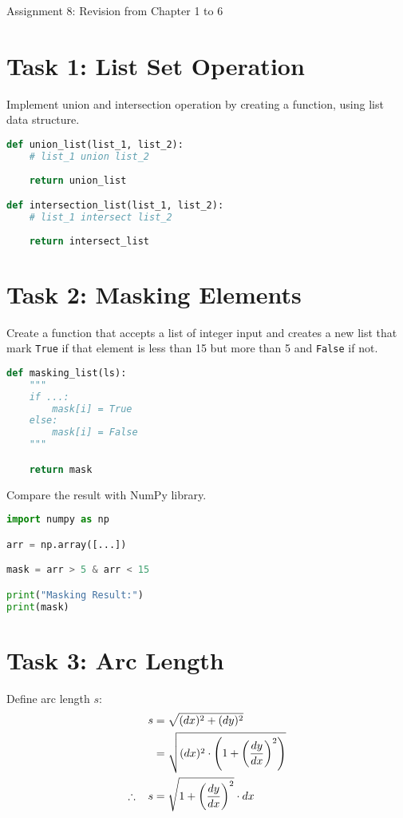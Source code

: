 \documentclass[11pt]{article}
\begin{document}
\begin{center}
    \Large{Assignment 8: Revision from Chapter 1 to 6}
\end{center}

\section*{Task 1: List Set Operation}
Implement union and intersection operation by creating a function, using list data structure.

\begin{lstlisting}[language=Python]
def union_list(list_1, list_2):
    # list_1 union list_2
    
    return union_list

def intersection_list(list_1, list_2):
    # list_1 intersect list_2
    
    return intersect_list
\end{lstlisting}


\section*{Task 2: Masking Elements}
Create a function that accepts a list of integer input and creates a new list that mark \texttt{True} if that element is less than 15 but more than 5 and \texttt{False} if not.

\begin{lstlisting}[language=Python]
def masking_list(ls):
    """
    if ...:
        mask[i] = True
    else:
        mask[i] = False
    """

    return mask
\end{lstlisting}

\noindent
Compare the result with NumPy library.

\begin{lstlisting}[language=Python]
import numpy as np

arr = np.array([...])

mask = arr > 5 & arr < 15

print("Masking Result:")
print(mask)
\end{lstlisting}

\section*{Task 3: Arc Length}
Define arc length \(s\):
\[
\begin{aligned}
    s &= \sqrt{(dx)^2 + (dy)^2}\\
    &= \sqrt{(dx)^2 \cdot \left(1 + \left(\frac{dy}{dx} \right)^2 \right)}\\
    \therefore \hspace{0.3cm} s &= \sqrt{1 + \left(\frac{dy}{dx} \right)^2} \cdot dx
\end{aligned}
\]
\end{document}
